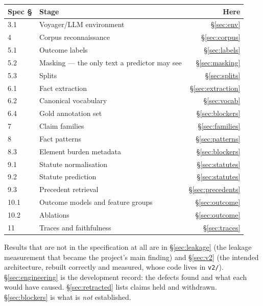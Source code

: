 \documentclass[12pt,a4paper]{article}
\newcommand{\code}[1]{\texttt{\small #1}}
\begin{document}
\begin{center}
\begin{tabular}{@{}llr@{}}
\toprule
\textbf{Spec §} & \textbf{Stage} & \textbf{Here} \\
\midrule
3.1  & Voyager/LLM environment            & §\ref{sec:env} \\
4    & Corpus reconnaissance              & §\ref{sec:corpus} \\
5.1  & Outcome labels                     & §\ref{sec:labels} \\
5.2  & Masking --- the only text a predictor may see & §\ref{sec:masking} \\
5.3  & Splits                             & §\ref{sec:splits} \\
6.1  & Fact extraction                    & §\ref{sec:extraction} \\
6.2  & Canonical vocabulary               & §\ref{sec:vocab} \\
6.4  & Gold annotation set                & §\ref{sec:blockers} \\
7    & Claim families                     & §\ref{sec:families} \\
8    & Fact patterns                      & §\ref{sec:patterns} \\
8.3  & Element burden metadata            & §\ref{sec:blockers} \\
9.1  & Statute normalisation              & §\ref{sec:statutes} \\
9.2  & Statute prediction                 & §\ref{sec:statutes} \\
9.3  & Precedent retrieval                & §\ref{sec:precedents} \\
10.1 & Outcome models and feature groups  & §\ref{sec:outcome} \\
10.2 & Ablations                          & §\ref{sec:outcome} \\
11   & Traces and faithfulness            & §\ref{sec:traces} \\
\bottomrule
\end{tabular}
\end{center}

\noindent
Results that are not in the specification at all are in §\ref{sec:leakage} (the leakage measurement
that became the project's main finding) and §\ref{sec:v2} (the intended architecture, rebuilt
correctly and measured, whose code lives in \code{v2/}). §\ref{sec:engineering} is the development
record: the defects found and what each would have caused. §\ref{sec:retracted} lists claims held
and withdrawn. §\ref{sec:blockers} is what is \emph{not} established.
\end{document}
